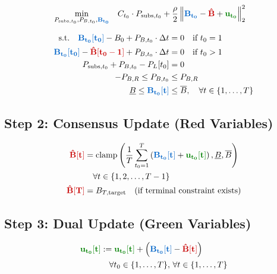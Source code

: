 \documentclass[11pt]{article}
\newcommand{\blueB}[1]{\textcolor{bluevar}{\mathbf{#1}}}      %
\newcommand{\redBhat}[1]{\textcolor{redvar}{\mathbf{#1}}}     %
\newcommand{\greenu}[1]{\textcolor{greenvar}{\mathbf{#1}}}    %
\begin{document}
\begin{align}
\min_{P_{\text{subs},t_0}, P_{B,t_0}, \blueB{B_{t_0}}} \quad & C_{t_0} \cdot P_{\text{subs},t_0} + \frac{\rho}{2} \left\| \blueB{B_{t_0}} - \redBhat{\hat{B}} + \greenu{u_{t_0}} \right\|_2^2
\end{align}

\begin{align}
\text{s.t.} \quad \blueB{B_{t_0}[t_0]} - B_0 + P_{B,t_0} \cdot \Delta t &= 0 \quad \text{if } t_0 = 1 \\
\blueB{B_{t_0}[t_0]} - \redBhat{\hat{B}[t_0-1]} + P_{B,t_0} \cdot \Delta t &= 0 \quad \text{if } t_0 > 1 \\
P_{\text{subs},t_0} + P_{B,t_0} - P_L[t_0] &= 0 \\
-P_{B,R} \leq P_{B,t_0} &\leq P_{B,R} \\
\underline{B} \leq \blueB{B_{t_0}[t]} &\leq \overline{B}, \quad \forall t \in \{1, \ldots, T\}
\end{align}


\subsection{Step 2: Consensus Update (Red Variables)}
\begin{align}
\redBhat{\hat{B}[t]} &= \text{clamp}\left( \frac{1}{T} \sum_{t_0=1}^{T} \left( \blueB{B_{t_0}[t]} + \greenu{u_{t_0}[t]} \right), \underline{B}, \overline{B} \right) \\
&\quad \forall t \in \{1, 2, \ldots, T-1\} \\
\redBhat{\hat{B}[T]} &= B_{T,\text{target}} \quad \text{(if terminal constraint exists)}
\end{align}

\subsection{Step 3: Dual Update (Green Variables)}
\begin{align}
\greenu{u_{t_0}[t]} &:= \greenu{u_{t_0}[t]} + \left( \blueB{B_{t_0}[t]} - \redBhat{\hat{B}[t]} \right) \\
&\quad \forall t_0 \in \{1, \ldots, T\}, \, \forall t \in \{1, \ldots, T\}
\end{align}
\end{document}
